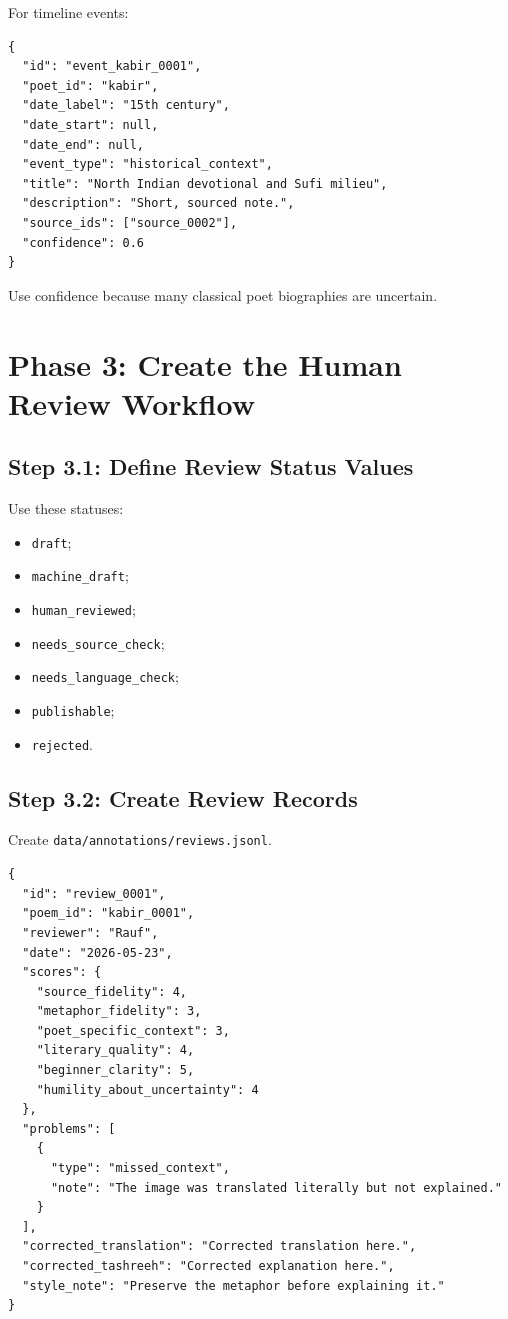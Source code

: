 \documentclass[11pt]{article}
\begin{document}
For timeline events:

\begin{verbatim}
{
  "id": "event_kabir_0001",
  "poet_id": "kabir",
  "date_label": "15th century",
  "date_start": null,
  "date_end": null,
  "event_type": "historical_context",
  "title": "North Indian devotional and Sufi milieu",
  "description": "Short, sourced note.",
  "source_ids": ["source_0002"],
  "confidence": 0.6
}
\end{verbatim}

Use confidence because many classical poet biographies are uncertain.

\section{Phase 3: Create the Human Review Workflow}

\subsection{Step 3.1: Define Review Status Values}

Use these statuses:

\begin{itemize}
  \item \verb|draft|;
  \item \verb|machine_draft|;
  \item \verb|human_reviewed|;
  \item \verb|needs_source_check|;
  \item \verb|needs_language_check|;
  \item \verb|publishable|;
  \item \verb|rejected|.
\end{itemize}

\subsection{Step 3.2: Create Review Records}

Create \verb|data/annotations/reviews.jsonl|.

\begin{verbatim}
{
  "id": "review_0001",
  "poem_id": "kabir_0001",
  "reviewer": "Rauf",
  "date": "2026-05-23",
  "scores": {
    "source_fidelity": 4,
    "metaphor_fidelity": 3,
    "poet_specific_context": 3,
    "literary_quality": 4,
    "beginner_clarity": 5,
    "humility_about_uncertainty": 4
  },
  "problems": [
    {
      "type": "missed_context",
      "note": "The image was translated literally but not explained."
    }
  ],
  "corrected_translation": "Corrected translation here.",
  "corrected_tashreeh": "Corrected explanation here.",
  "style_note": "Preserve the metaphor before explaining it."
}
\end{verbatim}
\end{document}
